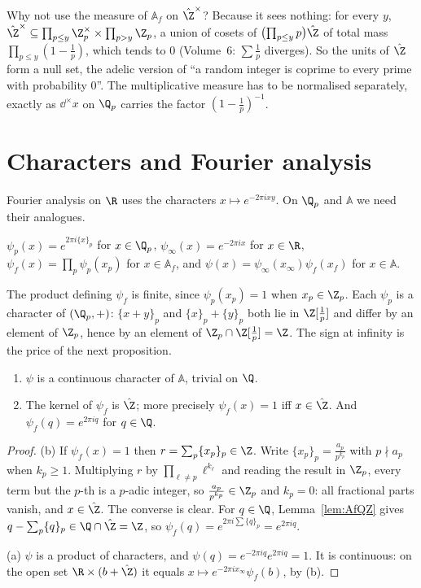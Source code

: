 \begin{think}
Why not use the measure of $\mathbb{A}_f$ on $\hat{\Z}^\times$? Because it sees nothing: for every $y$, $\hat{\Z}^\times\subseteq\prod_{p\le y}\Z_p^\times\times\prod_{p>y}\Z_p$, a union of cosets of
$\bigl(\prod_{p\le y}p\bigr)\hat{\Z}$ of total mass $\prod_{p\le y}(1-\frac1p)$, which tends to $0$ (Volume~6: $\sum\frac1p$ diverges). So the units of
$\hat{\Z}$ form a null set, the adelic version of ``a random integer is coprime to every prime with probability $0$''. The multiplicative
measure has to be normalised separately, exactly as $\dd^\times x$ on $\Q_p$ carries the factor $(1-\frac1p)^{-1}$.
\end{think}

\section{Characters and Fourier analysis}

Fourier analysis on $\R$ uses the characters $x\mapsto e^{-2\pi ixy}$. On $\Q_p$ and $\mathbb{A}$ we need their analogues.

\begin{definition}
$\psi_p(x)=e^{2\pi i\{x\}_p}$ for $x\in\Q_p$, \quad $\psi_\infty(x)=e^{-2\pi ix}$ for $x\in\R$, \quad
$\psi_f(x)=\prod_p\psi_p(x_p)$ for $x\in\mathbb{A}_f$, \quad and $\psi(x)=\psi_\infty(x_\infty)\psi_f(x_f)$ for $x\in\mathbb{A}$.
\end{definition}

The product defining $\psi_f$ is finite, since $\psi_p(x_p)=1$ when $x_p\in\Z_p$. Each $\psi_p$ is a character of $(\Q_p,+)$: $\{x+y\}_p$
and $\{x\}_p+\{y\}_p$ both lie in $\Z[\frac1p]$ and differ by an element of $\Z_p$, hence by an element of $\Z_p\cap\Z[\frac1p]=\Z$. The sign
at infinity is the price of the next proposition.

\begin{proposition}\label{prop:psiQ}
\begin{enumerate}[label=(\alph*)]
\item $\psi$ is a continuous character of $\mathbb{A}$, trivial on $\Q$.
\item The kernel of $\psi_f$ is $\hat{\Z}$; more precisely $\psi_f(x)=1$ iff $x\in\hat{\Z}$. And $\psi_f(q)=e^{2\pi iq}$ for $q\in\Q$.
\end{enumerate}
\end{proposition}
\begin{proof}
(b) If $\psi_f(x)=1$ then $r=\sum_p\{x_p\}_p\in\Z$. Write $\{x_p\}_p=\frac{a_p}{p^{k_p}}$ with $p\nmid a_p$ when $k_p\ge1$. Multiplying
$r$ by $\prod_{\ell\ne p}\ell^{k_\ell}$ and reading the result in $\Z_p$, every term but the $p$-th is a $p$-adic integer, so
$\frac{a_p}{p^{k_p}}\in\Z_p$ and $k_p=0$: all fractional parts vanish, and $x\in\hat{\Z}$. The converse is clear. For $q\in\Q$,
Lemma~\ref{lem:AfQZ} gives $q-\sum_p\{q\}_p\in\Q\cap\hat{\Z}=\Z$, so $\psi_f(q)=e^{2\pi i\sum\{q\}_p}=e^{2\pi iq}$.

(a) $\psi$ is a product of characters, and $\psi(q)=e^{-2\pi iq}e^{2\pi iq}=1$. It is continuous: on the open set $\R\times(b+\hat{\Z})$ it
equals $x\mapsto e^{-2\pi ix_\infty}\psi_f(b)$, by (b).
\end{proof}

